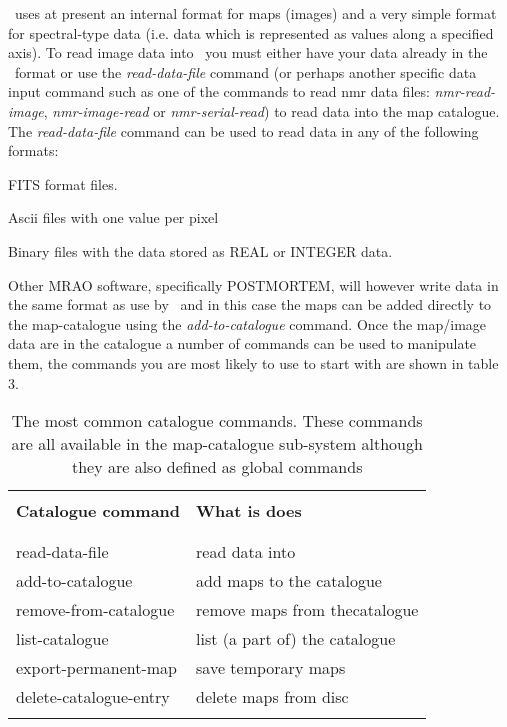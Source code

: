 \Anmap\ uses at present an internal format for maps (images) and
a very simple format for spectral-type data (i.e. data which is
represented as values along a specified axis).  To read image data
into \Anmap\ you must either have your data already in the \Anmap\
format or use the {\em read-data-file} command (or perhaps another
specific data input command such as one of the commands to
read nmr data files: {\em nmr-read-image}, {\em nmr-image-read} 
or {\em nmr-serial-read}) to read data into the map catalogue.  
The {\em read-data-file} command can be used to read data in any
of the following formats:
\begin{npars}
\item FITS format files.
\item Ascii files with one value per pixel
\item Binary files with the data stored as REAL or INTEGER data.
\end{npars}
Other MRAO software, specifically POSTMORTEM, will however write data
in the same format as use by \Anmap\ and in this case the maps can
be added directly to the map-catalogue using the {\em add-to-catalogue}
command.
Once the map/image data are in the catalogue a number of commands can
be used to manipulate them, the commands you are most likely to use
to start with are shown in table 3.
\begin{table}
\begin{tabular}{|l||l|}
\hline
& \\
{\bf Catalogue command} & {\bf What is does} \\
& \\ \hline
& \\
read-data-file & read data into \Anmap\ \\
add-to-catalogue & add maps to the catalogue \\
remove-from-catalogue & remove maps from thecatalogue \\
list-catalogue & list (a part of) the catalogue \\
export-permanent-map & save temporary maps \\
delete-catalogue-entry & delete maps from disc \\
& \\ \hline
\end{tabular}
\caption{The most common catalogue commands.  These commands are
all available in the map-catalogue sub-system although they are also
defined as global commands}
\end{table}

